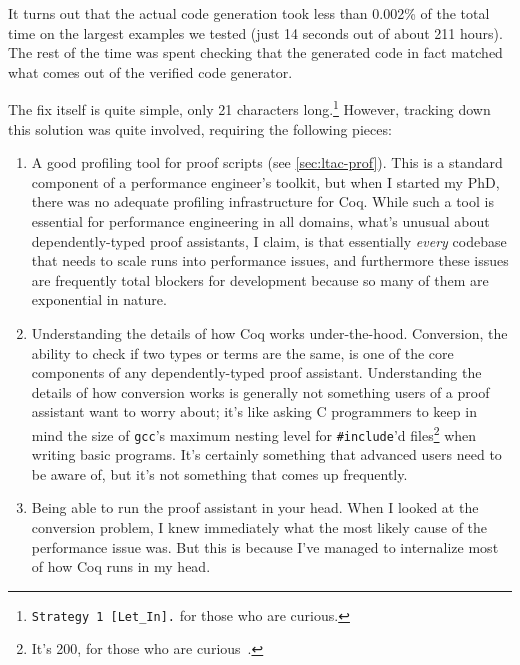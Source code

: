 It turns out that the actual code generation took less than 0.002\% of the total time on the largest examples we tested (just 14 seconds out of about 211 hours).
The rest of the time was spent checking that the generated code in fact matched what comes out of the verified code generator.

The fix itself is quite simple, only 21 characters long.\footnote{\texttt{Strategy 1 [Let\_In].} for those who are curious.}
However, tracking down this solution was quite involved, requiring the following pieces:
\begin{enumerate}
  \item
    A good profiling tool for proof scripts (see \autoref{sec:ltac-prof}).
    This is a standard component of a performance engineer's toolkit, but when I started my PhD, there was no adequate profiling infrastructure for Coq.
    While such a tool is essential for performance engineering in all domains, what's unusual about dependently-typed proof assistants, I claim, is that essentially \emph{every} codebase that needs to scale runs into performance issues, and furthermore these issues are frequently total blockers for development because so many of them are exponential in nature.
  \item
    Understanding the details of how Coq works under-the-hood.
    Conversion, the ability to check if two types or terms are the same, is one of the core components of any dependently-typed proof assistant.
    Understanding the details of how conversion works is generally not something users of a proof assistant want to worry about; it's like asking C programmers to keep in mind the size of \texttt{gcc}'s maximum nesting level for \texttt{\#include}'d files\footnote{It's 200, for those who are curious~\cite{C2017FSF}.} when writing basic programs.
    It's certainly something that advanced users need to be aware of, but it's not something that comes up frequently.
  \item
    Being able to run the proof assistant in your head.
    When I looked at the conversion problem, I knew immediately what the most likely cause of the performance issue was.
    But this is because I've managed to internalize most of how Coq runs in my head.


\end{enumerate}
